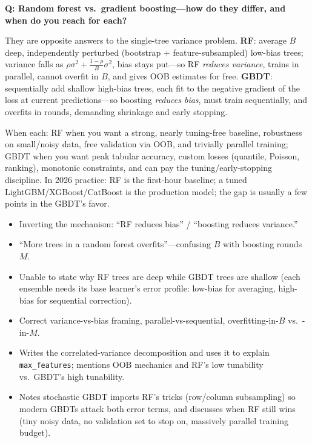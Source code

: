 \begin{interviewq}
\textbf{Q: Random forest vs.\ gradient boosting---how do they differ, and when do you reach for each?}

 \quad {} \quad \badgefreq{\freqhigh}

\stronganswer

They are opposite answers to the single-tree variance problem. \textbf{RF}: average $B$ deep, independently perturbed (bootstrap + feature-subsampled) low-bias trees; variance falls as $\rho\sigma^2 + \frac{1-\rho}{B}\sigma^2$, bias stays put---so RF \textit{reduces variance}, trains in parallel, cannot overfit in $B$, and gives OOB estimates for free. \textbf{GBDT}: sequentially add shallow high-bias trees, each fit to the negative gradient of the loss at current predictions---so boosting \textit{reduces bias}, must train sequentially, and overfits in rounds, demanding shrinkage and early stopping.

When each: RF when you want a strong, nearly tuning-free baseline, robustness on small/noisy data, free validation via OOB, and trivially parallel training; GBDT when you want peak tabular accuracy, custom losses (quantile, Poisson, ranking), monotonic constraints, and can pay the tuning/early-stopping discipline. In 2026 practice: RF is the first-hour baseline; a tuned LightGBM/XGBoost/CatBoost is the production model; the gap is usually a few points in the GBDT's favor.

\redflags
\begin{itemize}
    \item Inverting the mechanism: ``RF reduces bias'' / ``boosting reduces variance.''
    \item ``More trees in a random forest overfits''---confusing $B$ with boosting rounds $M$.
    \item Unable to state why RF trees are deep while GBDT trees are shallow (each ensemble needs its base learner's error profile: low-bias for averaging, high-bias for sequential correction).
\end{itemize}


\goodgreat
\begin{itemize}
    \item {} Correct variance-vs-bias framing, parallel-vs-sequential, overfitting-in-$B$ vs.\ -in-$M$.
    \item {} Writes the correlated-variance decomposition and uses it to explain \texttt{max\_features}; mentions OOB mechanics and RF's low tunability vs.\ GBDT's high tunability.
    \item {} Notes stochastic GBDT imports RF's tricks (row/column subsampling) so modern GBDTs attack both error terms, and discusses when RF still wins (tiny noisy data, no validation set to stop on, massively parallel training budget).
\end{itemize}


\end{interviewq}
